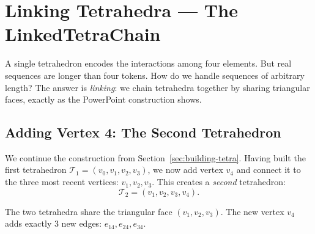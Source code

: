 \section{Linking Tetrahedra --- The LinkedTetraChain}
\label{sec:linked-tetra-chain}

A single tetrahedron encodes the interactions among four elements. But real
sequences are longer than four tokens. How do we handle sequences of arbitrary
length? The answer is \emph{linking}: we chain tetrahedra together by sharing
triangular faces, exactly as the PowerPoint construction shows.

\subsection{Adding Vertex 4: The Second Tetrahedron}
\label{sec:add-v4}

We continue the construction from Section~\ref{sec:building-tetra}. Having
built the first tetrahedron $\mathcal{T}_1 = (v_0, v_1, v_2, v_3)$, we now add
vertex $v_4$ and connect it to the three most recent vertices: $v_1, v_2, v_3$.
This creates a \emph{second} tetrahedron:
\[
  \mathcal{T}_2 = (v_1, v_2, v_3, v_4).
\]

The two tetrahedra share the triangular face $(v_1, v_2, v_3)$. The new vertex
$v_4$ adds exactly 3 new edges: $e_{14}, e_{24}, e_{34}$.

